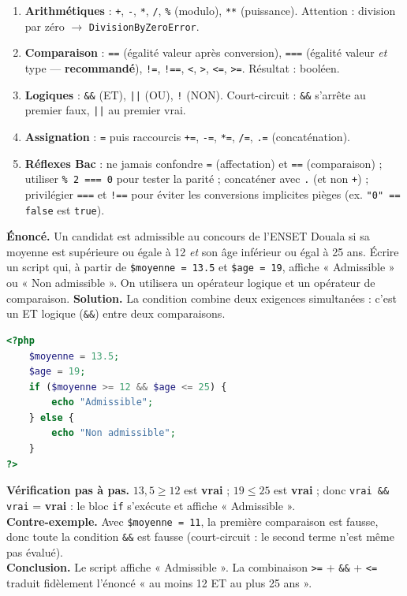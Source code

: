 \documentclass[11pt]{article}
\begin{document}
\begin{methode}
\begin{enumerate}
  \item \textbf{Arithmétiques} : \texttt{+}, \texttt{-}, \texttt{*}, \texttt{/}, \texttt{\%} (modulo), \texttt{*{}*} (puissance). Attention : division par zéro $\rightarrow$ \texttt{DivisionByZeroError}.
  \item \textbf{Comparaison} : \texttt{==} (égalité valeur après conversion), \texttt{===} (égalité valeur \emph{et} type — \textbf{recommandé}), \texttt{!=}, \texttt{!==}, \texttt{<}, \texttt{>}, \texttt{<=}, \texttt{>=}. Résultat : booléen.
  \item \textbf{Logiques} : \texttt{\&\&} (ET), \texttt{||} (OU), \texttt{!} (NON). Court-circuit : \texttt{\&\&} s'arrête au premier faux, \texttt{||} au premier vrai.
  \item \textbf{Assignation} : \texttt{=} puis raccourcis \texttt{+=}, \texttt{-=}, \texttt{*=}, \texttt{/=}, \texttt{.=} (concaténation).
  \item \textbf{Réflexes Bac} : ne jamais confondre \texttt{=} (affectation) et \texttt{==} (comparaison) ; utiliser \texttt{\% 2 === 0} pour tester la parité ; concaténer avec \texttt{.} (et non \texttt{+}) ; privilégier \texttt{===} et \texttt{!==} pour éviter les conversions implicites pièges (ex. \texttt{"0" == false} est \texttt{true}).
\end{enumerate}
\end{methode}

\begin{exoresolu}
\textbf{Énoncé.} Un candidat est admissible au concours de l'ENSET Douala si sa moyenne est supérieure ou égale à 12 \emph{et} son âge inférieur ou égal à 25 ans. Écrire un script qui, à partir de \texttt{\$moyenne = 13.5} et \texttt{\$age = 19}, affiche « Admissible » ou « Non admissible ». On utilisera un opérateur logique et un opérateur de comparaison.
\tcblower
\textbf{Solution.} La condition combine deux exigences simultanées : c'est un ET logique (\texttt{\&\&}) entre deux comparaisons.
\begin{lstlisting}[language=Php]
<?php
    $moyenne = 13.5;
    $age = 19;
    if ($moyenne >= 12 && $age <= 25) {
        echo "Admissible";
    } else {
        echo "Non admissible";
    }
?>
\end{lstlisting}
\textbf{Vérification pas à pas.} $13,5 \geq 12$ est \textbf{vrai} ; $19 \leq 25$ est \textbf{vrai} ; donc \texttt{vrai \&\& vrai} = \textbf{vrai} : le bloc \texttt{if} s'exécute et affiche « Admissible ».\\
\textbf{Contre-exemple.} Avec \texttt{\$moyenne = 11}, la première comparaison est fausse, donc toute la condition \texttt{\&\&} est fausse (court-circuit : le second terme n'est même pas évalué).\\
\textbf{Conclusion.} Le script affiche « Admissible ». La combinaison \texttt{>=} + \texttt{\&\&} + \texttt{<=} traduit fidèlement l'énoncé « au moins 12 ET au plus 25 ans ».
\end{exoresolu}
\end{document}
